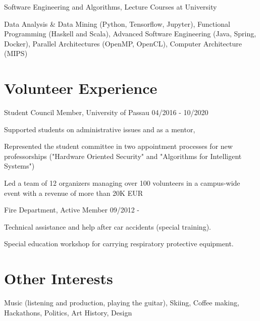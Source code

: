\documentclass{article}
\renewenvironment{itemize}[1]{\begin{compactitem}#1}{\end{compactitem}}
\begin{document}
\ralewaysb Software Engineering and Algorithms, Lecture Courses at University \raleway 
\begin{itemize}[-]
  \item Data Analysis \& Data Mining (Python, Tensorflow, Jupyter), Functional Programming (Haskell and Scala), Advanced Software Engineering (Java, Spring, Docker), Parallel Architectures (OpenMP, OpenCL), Computer Architecture (MIPS)
\end{itemize}

\vspace{.9em}

\section{Volunteer Experience}

\ralewaysb Student Council Member, \raleway University of Passau \hfill 04/2016 - 10/2020
\begin{itemize}[-]
  \item Supported students on administrative issues and as a mentor, 
  \item Represented the student committee in two appointment processes for new professorships ("Hardware Oriented Security" and "Algorithms for Intelligent Systems")
  \item Led a team of 12 organizers managing over 100 volunteers in a campus-wide event with a revenue of more than 20K EUR

\end{itemize}

\ralewaysb Fire Department, \raleway Active Member \hfill 09/2012 - 
\begin{itemize}[-]
  \item Technical assistance and help after car accidents (special training).
  \item Special education workshop for carrying respiratory protective equipment.
\end{itemize}


\vspace{.9em}
\section{Other Interests}
Music (listening and production, playing the guitar), Skiing, Coffee making, Hackathons, Politics, Art History, Design

\end{document}
